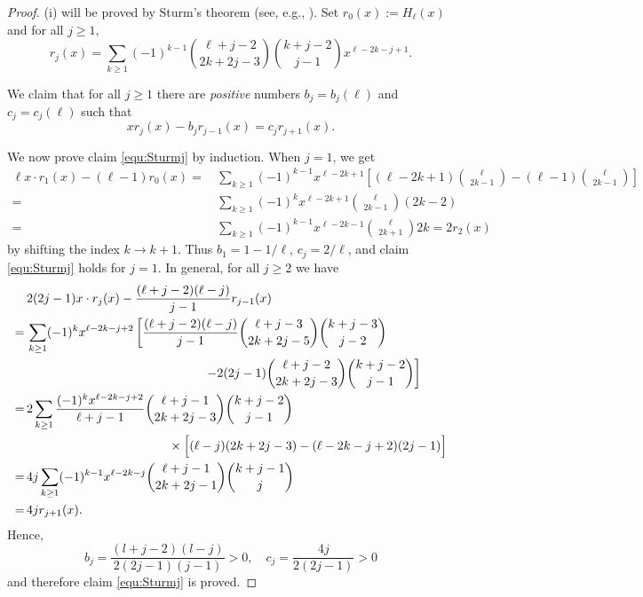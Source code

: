 \documentclass[11pt]{article}
\theoremstyle{plain}
\theoremstyle{definition}
\begin{document}
\begin{proof}
(i) will be proved by Sturm's theorem (see, e.g., \cite{Dorrie1965}). Set $r_0(x):=H_{\ell}(x)$ and for all $j\ge 1$,
\begin{equation*}
    r_{j}(x)= \sum_{k\ge 1} (-1)^{k-1}  \binom{\ell+j-2}{2k+2j-3} \binom{k+j-2}{j-1} x^{\ell-2k-j+1} .
\end{equation*}

We claim that for all $j\ge 1$ there are \emph{positive} numbers $b_j=b_j(\ell)$ and $c_j=c_j(\ell)$ such that
\begin{equation}\label{equ:Sturmj}
  x r_{j}(x) -b_j r_{j-1}(x) =c_j r_{j+1}(x).
\end{equation}

We now prove claim \eqref{equ:Sturmj} by induction. When $j=1$, we get
\begin{align*}
\ell x\cdot r_1(x) -(\ell -1)  r_0(x)
=&\,\sum_{k\ge 1} (-1)^{k-1}  x^{\ell-2k+1} \left[(\ell-2k+1)\binom{\ell}{2k-1}-(\ell -1)\binom{\ell}{2k-1}\right]\\
=&\,\sum_{k\ge 1} (-1)^{k}  x^{\ell-2k+1}  \binom{\ell}{2k-1}(2k-2) \\
=&\,\sum_{k\ge 1} (-1)^{k-1}  x^{\ell-2k-1} \binom{\ell}{2k+1}2k =2 r_2(x)
\end{align*}
by shifting the index $k\to k+1$. Thus $b_1=1 -1/\ell$, $c_j=2/\ell$, and claim \eqref{equ:Sturmj} holds for $j=1$.
In general, for all $j\ge 2$ we have
\begin{align*}
&\,2(2j-1) x\cdot r_{j}(x) - \frac{(\ell+j-2)(\ell-j)}{j-1}  r_{j-1}(x)\\
=&\, \sum_{k\ge 1}  (-1)^{k} x^{\ell-2k-j+2} \left[  \frac{(\ell+j-2)(\ell-j)}{j-1}  \binom{\ell+j-3}{2k+2j-5} \binom{k+j-3}{j-2} \right.\\
&\, \hskip5cm \left.-2(2j-1)\binom{\ell+j-2}{2k+2j-3} \binom{k+j-2}{j-1}\right]\\
=&\, 2\sum_{k\ge 1}  \frac{(-1)^{k} x^{\ell-2k-j+2}}{\ell+j-1}\binom{\ell+j-1}{2k+2j-3} \binom{k+j-2}{j-1}\\
&\, \hskip4cm  \times \Big[ (\ell-j)(2k+2j-3)-(\ell-2k-j+2)(2j-1) \Big]\\
=&\, 4j \sum_{k\ge 1}  (-1)^{k-1} x^{\ell-2k-j} \binom{\ell+j-1}{2k+2j-1} \binom{k+j-1}{j} \\
=&\, 4j r_{j+1}(x).
\end{align*}
Hence,
\begin{equation*}
 b_j= \frac{(l+j-2)(l-j)}{2(2j-1)(j-1)}>0, \quad c_j= \frac{4j}{2(2j-1)}>0
\end{equation*}
and therefore claim \eqref{equ:Sturmj} is proved.


\end{proof}
\end{document}
